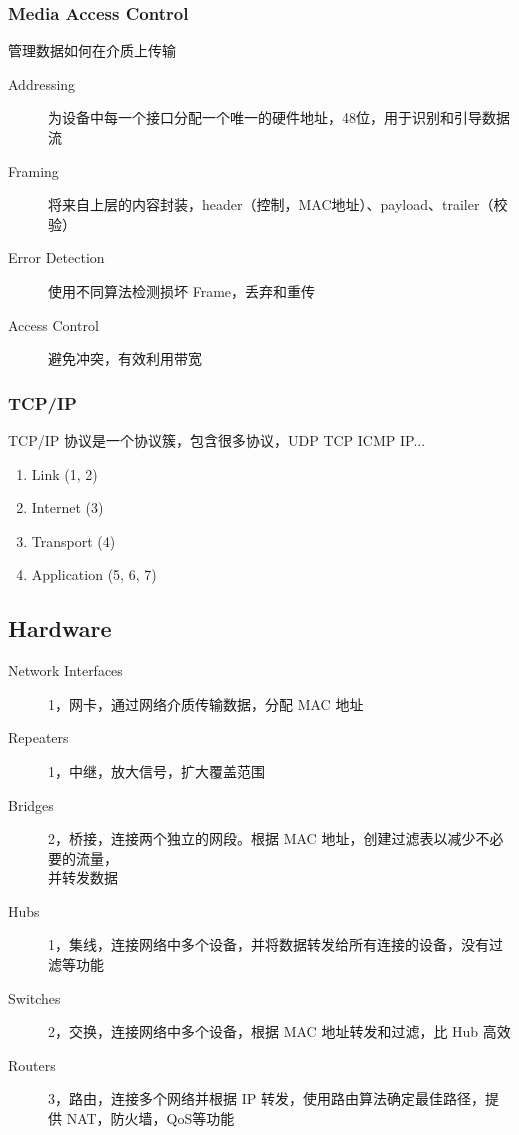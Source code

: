 \documentclass[11pt,journal,compsoc]{IEEEtran}
\begin{document}
\subsubsection{Media Access Control}

管理数据如何在介质上传输

\begin{description}
    \item[Addressing] 为设备中每一个接口分配一个唯一的硬件地址，48位，用于识别和引导数据流

    \item[Framing] 将来自上层的内容封装，header（控制，MAC地址）、payload、trailer（校验）

    \item[Error Detection] 使用不同算法检测损坏 Frame，丢弃和重传

    \item[Access Control] 避免冲突，有效利用带宽
\end{description}


\subsubsection{TCP/IP}

TCP/IP 协议是一个协议簇，包含很多协议，UDP TCP ICMP IP...

\begin{enumerate}
    \item Link (1, 2)
    \item Internet (3)
    \item Transport (4)
    \item Application (5, 6, 7)
\end{enumerate}


\subsection{Hardware}

\begin{description}
    \item[Network Interfaces] 1，网卡，通过网络介质传输数据，分配 MAC 地址

    \item[Repeaters] 1，中继，放大信号，扩大覆盖范围

    \item[Bridges] 2，桥接，连接两个独立的网段。根据 MAC 地址，创建过滤表以减少不必要的流量，\\ 并转发数据

    \item[Hubs] 1，集线，连接网络中多个设备，并将数据转发给所有连接的设备，没有过滤等功能

    \item[Switches] 2，交换，连接网络中多个设备，根据 MAC 地址转发和过滤，比 Hub 高效

    \item[Routers] 3，路由，连接多个网络并根据 IP 转发，使用路由算法确定最佳路径，提供 NAT，防火墙，QoS等功能
\end{description}
\end{document}
